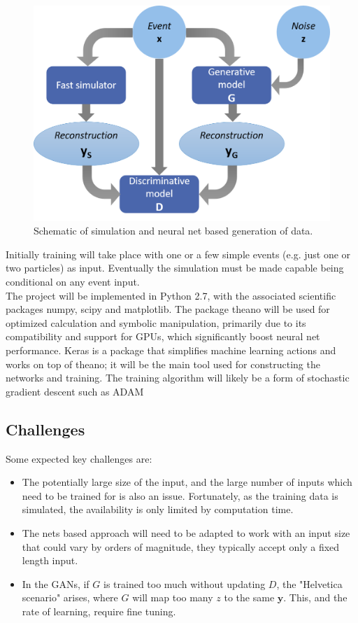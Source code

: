 \documentclass{article}
\begin{document}
\begin{figure}[H]
	\centering
	\includegraphics[width=0.6\linewidth]{img/mldiag}
	
	\caption{Schematic of simulation and neural net based generation of data.}
	\label{fig:mldiag}
	
\end{figure}


Initially training will take place with one or a few simple events (e.g. just one or two particles) as input. Eventually the simulation must be made capable being conditional on any event input.\\

The project will be implemented in Python 2.7, with the associated scientific packages numpy, scipy and matplotlib. The package theano \cite{theano} will be used for optimized calculation and symbolic manipulation, primarily due to its compatibility and support for GPUs, which significantly boost neural net performance. Keras \cite{keras} is a package that simplifies machine learning actions and works on top of theano; it will be the main tool used for constructing the networks and training. The training algorithm will likely be a form of stochastic gradient descent such as ADAM \cite{adam}\\

\subsection{Challenges}

Some expected key challenges are:
\begin{itemize}
	\item The potentially large size of the input, and the large number of inputs which need to be trained for is also an issue. Fortunately, as the training data is simulated, the availability is only limited by computation time. 
	\item The nets based approach will need to be adapted to work with an input size that could vary by orders of magnitude, they typically accept only a fixed length input. 
	\item In the GANs, if $G$ is trained too much without updating $D$, the "Helvetica scenario" arises, where $G$ will map too many $z$ to the same $\mathbf{y}$. This, and the rate of learning, require fine tuning. 
\end{itemize}
\end{document}
